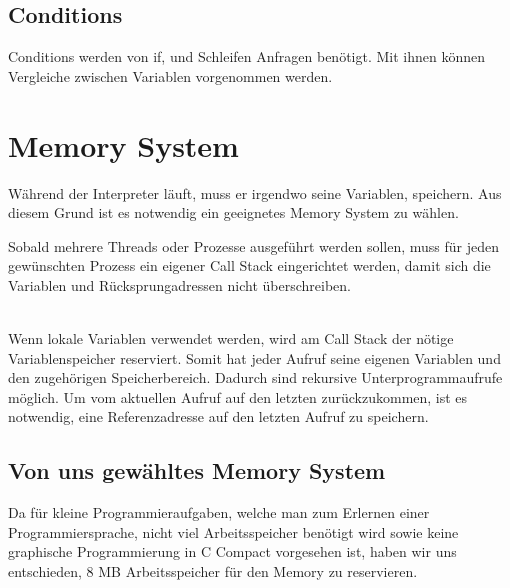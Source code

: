 \subsection{Conditions}
Conditions werden von if, und Schleifen Anfragen benötigt. Mit ihnen können Vergleiche zwischen Variablen vorgenommen werden.



\section{Memory System}
\label{sec:memory_system}
Während der Interpreter läuft, muss er irgendwo seine Variablen, speichern. Aus diesem Grund ist es notwendig ein geeignetes Memory System zu wählen.


Sobald mehrere Threads oder Prozesse ausgeführt werden sollen, muss für jeden gewünschten Prozess ein eigener Call Stack eingerichtet
werden, damit sich die Variablen und Rücksprungadressen nicht überschreiben.

\\
Wenn lokale Variablen verwendet werden, wird am Call Stack der nötige Variablenspeicher reserviert. Somit hat jeder Aufruf seine eigenen Variablen und den zugehörigen Speicherbereich. Dadurch sind rekursive Unterprogrammaufrufe möglich. Um vom aktuellen Aufruf auf den letzten zurückzukommen, ist es notwendig, eine Referenzadresse auf den letzten Aufruf zu speichern.

\subsection{Von uns gewähltes Memory System}
Da für kleine Programmieraufgaben, welche man zum Erlernen einer Programmiersprache, nicht viel Arbeitsspeicher benötigt wird sowie keine graphische Programmierung in C Compact vorgesehen ist, haben wir uns entschieden, 8 MB Arbeitsspeicher für den Memory zu reservieren.

